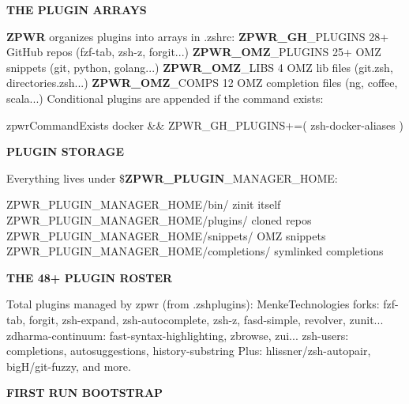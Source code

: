 \documentclass[11pt,a4paper,twoside]{book}
\begin{document}
\vspace{12pt}
{\bfseries\color{neonyellow} THE PLUGIN ARRAYS}\vspace{4pt}

\textbf{ZPWR} organizes plugins into arrays in .zshrc: \textbf{ZPWR\_GH}\_PLUGINS   28+ GitHub repos (fzf-tab, zsh-z, forgit...) \textbf{ZPWR\_OMZ}\_PLUGINS  25+ OMZ snippets (git, python, golang...) \textbf{ZPWR\_OMZ}\_LIBS     4 OMZ lib files (git.zsh, directories.zsh...) \textbf{ZPWR\_OMZ}\_COMPS    12 OMZ completion files (ng, coffee, scala...) Conditional plugins are appended if the command exists:

\begin{codebox}
\color{neongreen}zpwrCommandExists docker \&\& ZPWR\_GH\_PLUGINS+=( zsh-docker-aliases )\\
\end{codebox}


\vspace{12pt}
{\bfseries\color{neonyellow} PLUGIN STORAGE}\vspace{4pt}

Everything lives under \$\textbf{ZPWR\_PLUGIN}\_MANAGER\_HOME:

\begin{codebox}
\color{neongreen}ZPWR\_PLUGIN\_MANAGER\_HOME/bin/         zinit itself\\
\color{neongreen}ZPWR\_PLUGIN\_MANAGER\_HOME/plugins/     cloned repos\\
\color{neongreen}ZPWR\_PLUGIN\_MANAGER\_HOME/snippets/    OMZ snippets\\
\color{neongreen}ZPWR\_PLUGIN\_MANAGER\_HOME/completions/  symlinked completions\\
\end{codebox}


\vspace{12pt}
{\bfseries\color{neonyellow} THE 48+ PLUGIN ROSTER}\vspace{4pt}

Total plugins managed by zpwr (from .zshplugins): MenkeTechnologies forks: fzf-tab, forgit, zsh-expand, zsh-autocomplete, zsh-z, fasd-simple, revolver, zunit... zdharma-continuum: fast-syntax-highlighting, zbrowse, zui... zsh-users: completions, autosuggestions, history-substring Plus: hlissner/zsh-autopair, bigH/git-fuzzy, and more.


\vspace{12pt}
{\bfseries\color{neonyellow} FIRST RUN BOOTSTRAP}\vspace{4pt}
\end{document}
